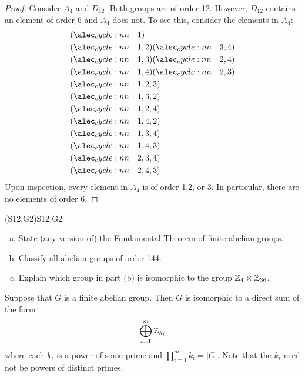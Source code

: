 \documentclass[../AlgebraQualSolutions.tex]{subfiles}
\begin{document}
\begin{proof}
	Consider $A_4$ and $D_{12}$. Both groups are of order 12. However, $D_{12}$ contains an element of order 6 and $A_4$ does not. To see this, consider the elements in $A_4$:
		\begin{align*}
			&\perm{1}\\
			&\perm{1,2}\perm{3,4}\\
			&\perm{1,3}\perm{2,4}\\
			&\perm{1,4}\perm{2,3}\\
			&\perm{1,2,3}\\
			&\perm{1,3,2}\\
			&\perm{1,2,4}\\
			&\perm{1,4,2}\\
			&\perm{1,3,4}\\
			&\perm{1,4,3}\\
			&\perm{2,3,4}\\
			&\perm{2,4,3}
		\end{align*}
	Upon inspection, every element in $A_4$ is of order 1,2, or 3. In particular, there are no elements of order 6.
\end{proof}

\begin{prob}{(S12.G2)}{S12.G2}
	\begin{enumerate}[(a)]
		\item State (any version of) the Fundamental Theorem of finite abelian groups.
		\item Classify all abelian groups of order 144.
		\item Explain which group in part (b) is isomorphic to the group $\mathbb{Z}_4 \times \mathbb{Z}_{36}$.
	\end{enumerate}
\end{prob}

Suppose that $G$ is a finite abelian group. Then $G$ is isomorphic to a direct sum of the form
	\[\bigoplus_{i=1}^m \mathbb{Z}_{k_i}\]
where each $k_i$ is a power of some prime and $\prod_{i=1}^m k_i = |G|$. Note that the $k_i$ need not be powers of distinct primes.
\end{document}
